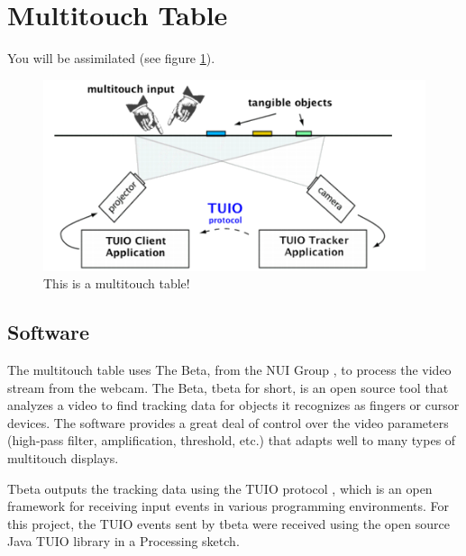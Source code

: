 \section{Multitouch Table}
You will be assimilated (see figure \ref{fig:mtdiagram}). 
\begin{figure}[htp]\centering
  \includegraphics[width=.8\textwidth]{images/mt-diagram.png}
  \caption{This is a multitouch table!}\label{fig:mtdiagram}
\end{figure}
\subsection{Software}
The multitouch table uses The Beta, from the NUI Group \cite{NUI}, to process the video stream from the webcam. The Beta, tbeta for short, is an open source tool that analyzes a video to find tracking data for objects it recognizes as fingers or cursor devices. The software provides a great deal of control over the video parameters (high-pass filter, amplification, threshold, etc.) that adapts well to many types of multitouch displays.

Tbeta outputs the tracking data using the TUIO protocol \cite{TUIO}, which is an open framework for receiving input events in various programming environments. For this project, the TUIO events sent by tbeta were received using the open source Java TUIO library in a Processing sketch. 
